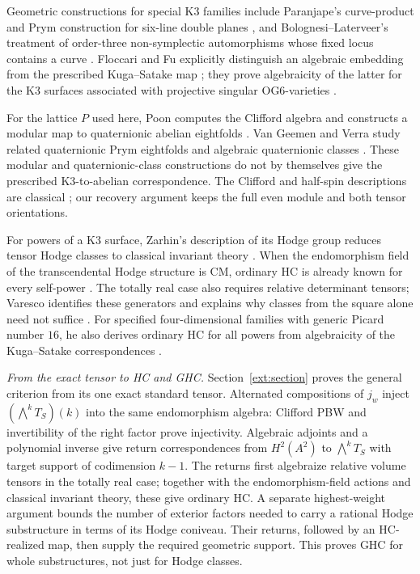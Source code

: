 \documentclass[11pt]{amsart}
\theoremstyle{definition}
\theoremstyle{remark}
\numberwithin{equation}{section}
\begin{document}
Geometric constructions for special K3 families include Paranjape's
curve-product and Prym construction for six-line double planes
\cite[Sections~2--4]{Paranjape}, and Bolognesi--Laterveer's treatment
of order-three non-symplectic automorphisms whose fixed locus contains
a curve \cite[Theorem~4.4 and Section~6]{BolognesiLaterveer}.
Floccari and Fu explicitly distinguish an algebraic embedding from
the prescribed Kuga--Satake map
\cite[Conjectures~2.4 and~2.6]{FloccariFuOG6}; they prove algebraicity
of the latter for the K3 surfaces associated with projective singular
OG6-varieties \cite[Corollary~4.7]{FloccariFuOG6}.

For the lattice $P$ used here, Poon computes the Clifford algebra and
constructs a modular map to quaternionic abelian eightfolds
\cite[Theorem~3.1.4 and Section~4]{Poon}.
Van Geemen and Verra study related quaternionic Prym eightfolds and
algebraic quaternionic classes \cite[Sections~3--4]{VanGeemenVerra}.
These modular and quaternionic-class constructions do not by themselves
give the prescribed K3-to-abelian correspondence.
The Clifford and half-spin descriptions are classical
\cite[Proposition~6.3 and Example~6.6]{VanGeemenKS}; our recovery
argument keeps the full even module and both tensor orientations.

For powers of a K3 surface, Zarhin's description of its Hodge group
reduces tensor Hodge classes to classical invariant theory
\cite{Zarhin1983}.  When the endomorphism field of the transcendental
Hodge structure is CM, ordinary HC is already known for every
self-power \cite[Corollary~2.3]{VarescoPowers}.
The totally real case also requires relative determinant tensors;
Varesco identifies these generators and explains why classes from
the square alone need not suffice \cite[Theorem~2.16]{VarescoPowers}.
For specified four-dimensional families with generic Picard number
$16$, he also derives ordinary HC for all powers from algebraicity
of the Kuga--Satake correspondences \cite[Theorem~0.2]{VarescoPowers}.

\emph{From the exact tensor to HC and GHC.}
Section~\ref{ext:section} proves the general criterion from its one
exact standard tensor.  Alternated compositions of $j_w$ inject
$(\bigwedge^kT_S)(k)$ into the same endomorphism algebra: Clifford
PBW and invertibility of the right factor prove injectivity.
Algebraic adjoints and a polynomial inverse give return
correspondences from $H^2(A^2)$ to $\bigwedge^kT_S$ with target
support of codimension $k-1$.
The returns first algebraize relative volume tensors in the totally
real case; together with
the endomorphism-field actions and classical invariant theory, these
give ordinary HC.  A separate highest-weight argument bounds the
number of exterior factors needed to carry a rational Hodge
substructure in terms of its Hodge coniveau.  Their returns, followed
by an HC-realized map, then supply the required geometric support.
This proves GHC for whole substructures, not just for Hodge classes.
\end{document}
